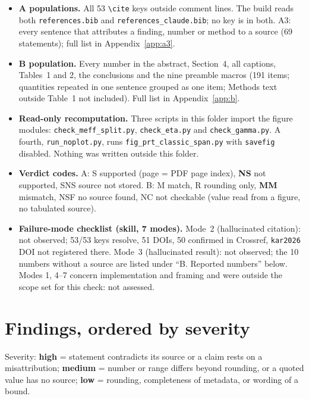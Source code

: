 \documentclass[10pt,a4paper]{article}
\renewcommand{\cite}[1]{[\texttt{#1}]}
\newcommand{\vS}{\textsf{S}}
\newcommand{\vNS}{\textbf{\textsf{NS}}}
\newcommand{\vSNS}{\textsf{SNS}}
\newcommand{\vM}{\textsf{M}}
\newcommand{\vR}{\textsf{R}}
\newcommand{\vMM}{\textbf{\textsf{MM}}}
\newcommand{\vNSF}{\textsf{NSF}}
\newcommand{\vNC}{\textsf{NC}}
\begin{document}
\begin{itemize}\itemsep0pt
\item \textbf{A populations.} All 53 \verb|\cite| keys outside comment lines. The build reads both
  \texttt{references.bib} and \texttt{references\_claude.bib}; no key is in both. A3: every sentence that
  attributes a finding, number or method to a source (69 statements); full list in Appendix~\ref{app:a3}.
\item \textbf{B population.} Every number in the abstract, Section~4, all captions, Tables~1 and 2, the conclusions and
  the nine preamble macros (191 items; quantities repeated in one sentence grouped as one item; Methods text outside
  Table~1 not included). Full list in Appendix~\ref{app:b}.
\item \textbf{Read-only recomputation.} Three scripts in this folder import the figure modules:
  \texttt{check\_meff\_split.py}, \texttt{check\_eta.py} and \texttt{check\_gamma.py}. A fourth,
  \texttt{run\_noplot.py}, runs \texttt{fig\_prt\_classic\_span.py} with \texttt{savefig} disabled. Nothing was written outside this folder.
\item \textbf{Verdict codes.} A: \vS{} supported (page = PDF page index), \vNS{} not supported, \vSNS{} source not
  stored. B: \vM{} match, \vR{} rounding only, \vMM{} mismatch, \vNSF{} no source found, \vNC{} not checkable (value
  read from a figure, no tabulated source).
\item \textbf{Failure-mode checklist (skill, 7 modes).} Mode~2 (hallucinated citation): not observed; 53/53 keys resolve,
  51 DOIs, 50 confirmed in Crossref, \texttt{kar2026} DOI not registered there. Mode~3 (hallucinated result): not
  observed; the 10 numbers without a source are listed under ``B. Reported numbers'' below. Modes 1, 4--7 concern
  implementation and framing and were outside the scope set for this check: not assessed.
\end{itemize}

\section*{Findings, ordered by severity}

Severity: \textbf{high} = statement contradicts its source or a claim rests on a misattribution;
\textbf{medium} = number or range differs beyond rounding, or a quoted value has no source; \textbf{low} = rounding,
completeness of metadata, or wording of a bound.
\end{document}
